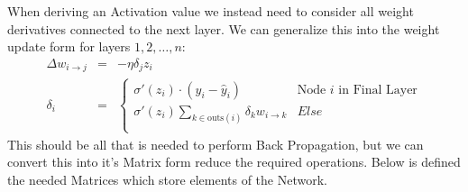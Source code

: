 \begin{flushleft}
                    When deriving an Activation value we instead need to consider all weight derivatives connected to the next layer. 
                    We can generalize this into the weight update form for layers $1,2, \hdots, n$:
                    \begin{eqnarray*}
                        \Delta w_{i \to j} &=& -\eta\delta_j z_i \\
                        \delta_i &=& 
                        \begin{cases}
                            \sigma'(z_i) \cdot (y_i - \hat{y}_i) & \text{Node $i$ in Final Layer} \\
                            \sigma'(z_i) \sum_{k\in\text{outs}(i)}  \delta_k w_{i \to k} & Else \\
                        \end{cases}
                    \end{eqnarray*}
                    This should be all that is needed to perform Back Propagation, but we can convert this into it's Matrix form reduce the required
                    operations. Below is defined the needed Matrices which store elements of the Network. \\


\end{flushleft}
